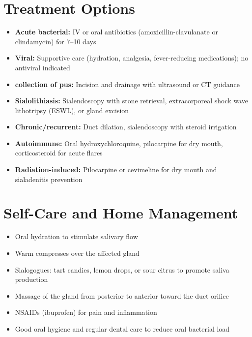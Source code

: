 \section*{Treatment Options}
\begin{itemize}
  \item \textbf{Acute bacterial:} IV or oral antibiotics (amoxicillin-clavulanate or clindamycin) for 7--10 days
  \item \textbf{Viral:} Supportive care (hydration, analgesia, fever-reducing medications); no antiviral indicated
  \item \textbf{collection of pus:} Incision and drainage with ultrasound or CT guidance
  \item \textbf{Sialolithiasis:} Sialendoscopy with stone retrieval, extracorporeal shock wave lithotripsy (ESWL), or gland excision
  \item \textbf{Chronic/recurrent:} Duct dilation, sialendoscopy with steroid irrigation
  \item \textbf{Autoimmune:} Oral hydroxychloroquine, pilocarpine for dry mouth, corticosteroid for acute flares
  \item \textbf{Radiation-induced:} Pilocarpine or cevimeline for dry mouth and sialadenitis prevention
\end{itemize}

\section*{Self-Care and Home Management}
\begin{itemize}
  \item Oral hydration to stimulate salivary flow
  \item Warm compresses over the affected gland
  \item Sialogogues: tart candies, lemon drops, or sour citrus to promote saliva production
  \item Massage of the gland from posterior to anterior toward the duct orifice
  \item NSAIDs (ibuprofen) for pain and inflammation
  \item Good oral hygiene and regular dental care to reduce oral bacterial load
\end{itemize}

